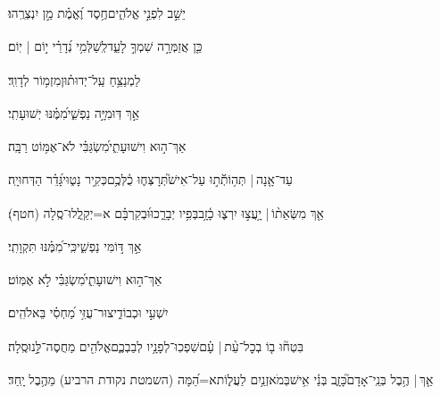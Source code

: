\documentclass[12pt]{article}
\newcommand{\loc}[1]{\textsuperscript{\locf{#1}}}
\begin{document}
{\loc{ ח}~}‏יֵשֵׁ֣ב  לִפְנֵ֣י אֱלֹהִ֑ים{\hfill}חֶ֥סֶד וֶ֝אֱמֶ֗ת מַ֣ן יִנְצְרֻֽהוּ׃\par

{\loc{ ט}~}‏כֵּ֤ן אֲזַמְּרָ֣ה שִׁמְךָ֣ לָעַ֑ד{\hfill}לְֽשַׁלְּמִ֥י נְ֝דָרַ֗י י֣וֹם | יֽוֹם׃\par\pend
\ledpb
\pstart[\subsection*{\textcolor{red}{פרק סב}}]\label{פרק סב}
{\loc{ א}~}‏לַמְנַצֵּ֥חַ עַֽל־יְדוּת֗וּן{\hfill}מִזְמ֥וֹר לְדָוִֽד׃\par

{\loc{ ב}~}‏אַ֣ךְ  דּֽוּמִיָּ֣ה נַפְשִׁ֑י{\hfill}מִ֝מֶּ֗נּוּ יְשׁוּעָתִֽי׃\par

{\loc{ ג}~}‏אַךְ־ה֣וּא  וִישׁוּעָתִ֑י{\hfill}מִ֝שְׂגַּבִּ֗י לֹא־אֶמּ֥וֹט רַבָּֽה׃\par

{\loc{ ד}~}‏עַד־אָ֤נָה |  תְּה֥וֹתְﬞת֣וּ עַל־אִישׁ֮{\hfill}תְּרָצְּח֢וּ כֻ֫לְּכֶ֥ם\newline\hspace*{.5em}כְּקִ֥יר נָט֑וּי{\hfill}גָּ֝דֵ֗ר הַדְּחוּיָֽה׃\par

{\loc{ ה}~}‏אַ֤ךְ מִשְּׂאֵת֨וֹ |  יָ֥עֲצ֣וּ {\hfill}יִרְצ֢וּ כָ֫זָ֥ב\newline\hspace*{.5em}בְּפִ֥יו יְבָרֵ֑כוּ{\hfill}וּ֝בְקִרְבָּ֗ם א=יְקַֽלֲלוּ־סֶֽלָה (חטף)׃\par

{\loc{ ו}~}‏אַ֣ךְ  דּ֣וֹמִּי נַפְשִׁ֑י{\hfill}כִּֽי־מִ֝מֶּ֗נּוּ תִּקְוָתִֽי׃\par

{\loc{ ז}~}‏אַךְ־ה֣וּא  וִישׁוּעָתִ֑י{\hfill}מִ֝שְׂגַּבִּ֗י לֹ֣א אֶמּֽוֹט׃\par

{\loc{ ח}~}‏ יִשְׁעִ֣י וּכְבוֹדִ֑י{\hfill}צוּר־עֻזִּ֥י מַ֝חְסִ֗י בֵּאלֹהִֽים׃\par

{\loc{ ט}~}‏בִּטְח֘וּ ב֤וֹ בְכׇל־עֵ֨ת |  עָ֗ם{\hfill}שִׁפְכֽוּ־לְפָנָ֥יו לְבַבְכֶ֑ם\newline\hspace*{.5em}אֱלֹהִ֖ים מַחֲסֶה־לָּ֣נוּ{\hfill}סֶֽלָה׃\par

{\loc{ י}~}‏אַ֤ךְ |  הֶ֥בֶל בְּנֵֽי־אָדָם֮{\hfill}כָּזָ֢ב בְּנֵ֫י אִ֥ישׁ\newline\hspace*{.5em}בְּמֹאזְנַ֥יִם לַעֲל֑וֹת{\hfill}א=הֵ֝מָּה (השמטת נקודת הרביע) מֵהֶ֥בֶל יָֽחַד׃\par
\end{document}
